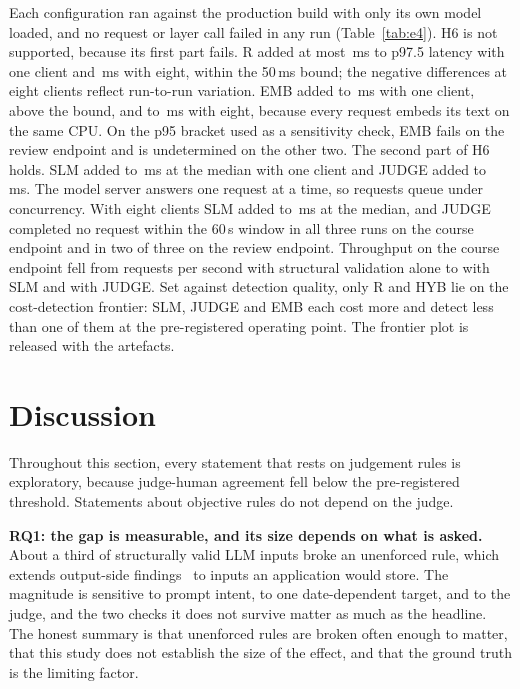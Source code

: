 \documentclass[journal]{IEEEtran}
\begin{document}
Each configuration ran against the production build with only its own model loaded, and no request
or layer call failed in any run (Table~\ref{tab:e4}). H6 is not supported, because its first part
fails. R added at most \,ms to p97.5 latency with one client and
\,ms with eight, within the 50\,ms bound; the negative differences at eight clients
reflect run-to-run variation. EMB added
 to \,ms with one client, above the bound, and
 to \,ms with eight, because every request embeds its text on the
same CPU. On the p95 bracket used as a sensitivity check, EMB fails on the review endpoint and is undetermined
on the other two. The second part of H6 holds. SLM added
 to \,ms at the median with one client and JUDGE added
 to \,ms. The model server answers one request at a
time, so requests queue under concurrency. With eight clients SLM added
 to \,ms at the median, and JUDGE completed no request
within the 60\,s window in all three runs on the course endpoint and in two of three on the review
endpoint. Throughput on the course endpoint fell from  requests per
second with structural validation alone to  with SLM and
 with JUDGE. Set against detection quality, only R and HYB lie on the cost-detection frontier: SLM, JUDGE and EMB
each cost more and detect less than one of them at the pre-registered operating point. The frontier
plot is released with the artefacts.


\section{Discussion}
\label{sec:discussion}

\ifjudgeweak Throughout this section, every statement that rests on judgement rules is exploratory,
because judge-human agreement fell below the pre-registered threshold. Statements about objective
rules do not depend on the judge.\fi

\textbf{RQ1: the gap is measurable, and its size depends on what is asked.} About a third of
structurally valid LLM inputs broke an unenforced rule, which extends output-side
findings~\cite{li2026orderbench,singh2026sob,wrenn2026enterprise} to inputs an application would
store. The magnitude is sensitive to prompt intent, to one date-dependent target, and to the judge, and
the two checks it does not survive matter as much as the headline. The honest summary is that
unenforced rules are broken often enough to matter, that this study does not establish the size of the
effect, and that the ground truth is the limiting factor.
\end{document}

